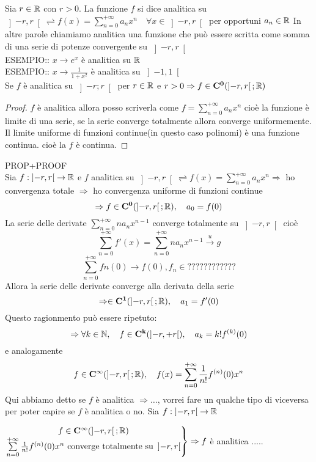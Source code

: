 Sia $r\in \mathbb{R}$ con $r>0$. La funzione $f$ si dice analitica su $\left]-r,r\right[ \rightleftharpoons f(x)=\sum\limits_{n=0}^{+\infty}a_nx^n \quad \forall x\in\left]-r,r\right[$ per opportuni $a_n\in \mathbb{R}$
\observation
In altre parole chiamiamo analitica una funzione che può essere scritta come somma di una serie di potenze convergente su $\left]-r,r\right[$ \\
ESEMPIO:: $x\to e^x$ è analitica su $ \mathbb{R}$\\
ESEMPIO:: $x\to\frac{1}{1+x^2}$ è analitica su $\left]-1,1\right[$\\
\proposition
Se $f$ è analitica su $\left]-r;r\right[$ per $r\in \mathbb{R}$ e $r>0\Rightarrow f\in \mathbf{C^{0}}(\left]-r,r\right[; \mathbb{R})$
\begin{proof}
	$f$ è analitica  allora posso scriverla come $f=\sum\limits_{n=0}^{+\infty}a_nx^n$ cioè la funzione è limite di una serie, se la serie converge totalmente allora converge uniformemente. Il limite uniforme di funzioni continue(in questo caso polinomi) è una funzione continua. cioè la $f$ è continua.
\end{proof}
\proposition PROP+PROOF\\
Sia $f:\left]-r,r\right[\to \mathbb{R}$ e $f$ analitica su $\left]-r,r\right[ \rightleftharpoons f(x)=\sum\limits_{n=0}^{+\infty}a_nx^n \Rightarrow$ ho convergenza totale $\Rightarrow$ ho convergenza uniforme di funzioni continue 
$$\Rightarrow f\in \mathbf{C^{0}}(\left]-r,r\right[; \mathbb{R}),\quad a_0=f(0)$$
La serie delle derivate $\sum\limits_{n=0}^{+\infty}na_nx^{n-1}$ converge totalmente su $\left]-r,r\right[$ cioè
$$\sum\limits_{n=0}^{+\infty}f'(x)=\sum\limits_{n=0}^{+\infty}na_nx^{n-1}\overset{u}{\to}g$$
$$\sum\limits_{n=0}^{+\infty}fn(0)\to f(0), f_n\in ????????????$$ 
Allora la serie delle derivate converge alla derivata della serie 
$$\Rightarrow \in \mathbf{C^{1}}(\left]-r,r\right[; \mathbb{R}),\quad a_1=f'(0)$$ 
Questo ragionmento può essere ripetuto:
$$\Rightarrow \forall k\in\mathbb{N},\quad f\in \mathbf{C^{k}}(\left]-r,+r\right[),\quad a_k=k!f^{(k)}(0)$$
e analogamente
$$f\in \mathbf{C^{\infty}}(\left]-r,r\right[; \mathbb{R}),\quad f(x)=\sum\limits_{n=0}^{+\infty}\frac{1}{n!}f^{(n)}(0)x^n$$
\observation Qui abbiamo detto se $f$ è analitica $\Rightarrow \ldots$, vorrei fare un qualche tipo di viceversa per poter capire se $f$ è analitica o no.
\proposition
Sia $f:\left]-r,r\right[\to \mathbb{R}$
\begin{center}
	$\left.\begin{matrix}
	f\in \mathbf{C^{\infty}}(\left]-r,r\right[; \mathbb{R})\\
	\sum\limits_{n=0}^{+\infty}\frac{1}{n!}f^{(n)}(0)x^n\text{ converge totalmente su } \left]-r,r\right[\\
	\end{matrix}\right\}\Rightarrow f$ è analitica  .....
\end{center}
